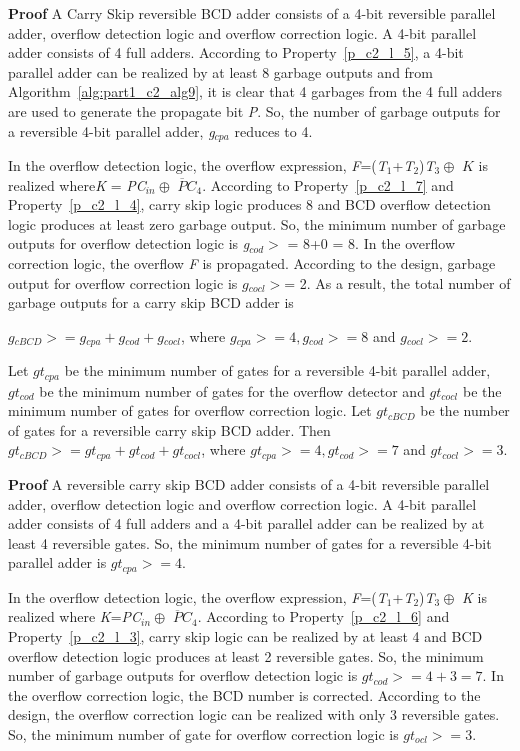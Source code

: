 \noindent\textbf{Proof}
A Carry Skip reversible BCD adder consists of a {4}-bit reversible parallel adder, overflow detection logic and overflow correction logic. A {4}-bit parallel adder consists of 4 full adders. According to Property~\ref{p_c2_l_5}, a {4}-bit parallel adder can be realized by at least 8 garbage outputs and from Algorithm~\ref{alg:part1_c2_alg9}, it is clear that 4 garbages from the 4 full adders are used to generate the propagate bit {\it P}. So, the number of garbage outputs for a reversible {4}-bit parallel adder, {\it g}${}_{cpa}$ reduces to 4.

In the overflow detection logic, the overflow expression, {\it F}=({\it T}${}_{1}$+{\it T}${}_{2}$){\it T}${}_{3} \oplus$ $K$ is realized where{\it K} = {\it PC}${}_{in}\oplus$ {\it $\overline{P}C$}${}_{4}$. According to Property~\ref{p_c2_l_7} and Property~\ref{p_c2_l_4}, carry skip logic produces 8 and BCD overflow detection logic produces at least zero garbage output. So, the minimum number of garbage outputs for overflow detection logic is {\it g}${}_{cod}$${>}$ = 8+0 = 8. In the overflow correction logic, the overflow {\it F }is propagated. According to the design, garbage output for overflow correction logic is $g{}_{cocl}$${>}$= 2. As a result, the total number of garbage outputs for a carry skip BCD adder is

$g{}_{cBCD}{>}= g{}_{cpa} + g{}_{cod} + g{}_{cocl}$, where $g{}_{cpa}{>}= 4, g{}_{cod}{>} = 8$ and $g{}_{cocl}{>}= 2$.

\begin{property}\textnormal{
		Let $gt{}_{cpa}$ be the minimum number of gates for a reversible 4-bit parallel adder, $gt{}_{cod}$ be the minimum number of gates for the overflow detector and $gt{}_{cocl}$ be the minimum number of gates for overflow correction logic. Let $gt{}_{cBCD}$ be the number of gates for a reversible carry skip BCD adder. Then	
		$gt{}_{cBCD}{>} = gt{}_{cpa} + gt{}_{cod} + gt{}_{cocl}$, where $gt{}_{cpa}{>}= 4, gt{}_{cod}{>}= 7$ and $gt{}_{cocl}{>}= 3.$}
\end{property}

\noindent\textbf{Proof}
A reversible carry skip BCD adder consists of a {4}-bit reversible parallel adder, overflow detection logic and overflow correction logic. A {4}-bit parallel adder consists of 4 full adders and a {4}-bit parallel adder can be realized by at least 4 reversible gates. So, the minimum number of gates for a reversible {4}-bit parallel adder is $gt{}_{cpa}{>}= 4$.

In the overflow detection logic, the overflow expression, {\it F}=({\it T}${}_{1}$+{\it T}${}_{2}$){\it T}${}_{3} \oplus$ {\it K} is realized where {\it K}={\it PC}${}_{in}\oplus$ {\it $\overline{P}C$}${}_{4}$. According to Property~\ref{p_c2_l_6} and Property~\ref{p_c2_l_3}, carry skip logic can be realized by at least 4 and BCD overflow detection logic produces at least 2 reversible gates. So, the minimum number of garbage outputs for overflow detection logic is $gt{}_{cod}{>} = 4+3=7$. In the overflow correction logic, the BCD number is corrected. According to the design, the overflow correction logic can be realized with only 3 reversible gates. So, the minimum number of gate for overflow correction logic is $gt{}_{ocl}{>} = 3$.

